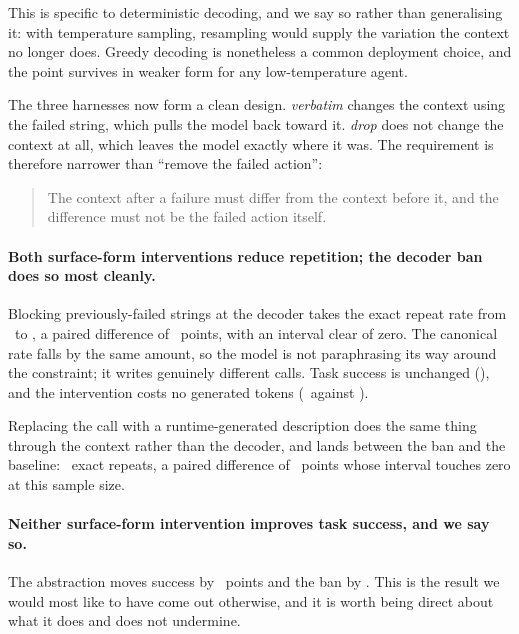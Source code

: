 This is specific to deterministic decoding, and we say so rather than
generalising it: with temperature sampling, resampling would supply the
variation the context no longer does. Greedy decoding is nonetheless a common
deployment choice, and the point survives in weaker form for any low-temperature
agent.

The three harnesses now form a clean design. \emph{verbatim} changes the context
using the failed string, which pulls the model back toward it. \emph{drop} does
not change the context at all, which leaves the model exactly where it was.
The requirement is therefore narrower than ``remove the failed action'':

\begin{quote}
The context after a failure must differ from the context before it, and the
difference must not be the failed action itself.
\end{quote}

\paragraph{Both surface-form interventions reduce repetition; the decoder ban
does so most cleanly.}
Blocking previously-failed strings at the decoder takes the exact repeat rate
from \AgentVerbatimRepeat\ to \AgentVerbBanRepeat, a paired difference of
\DeltaVerbBanRepeat\ points, with an interval clear of zero. The canonical rate
falls by the same amount, so the model is not paraphrasing its way around the constraint; it writes
genuinely different calls. Task success is
unchanged (\DeltaVerbBanSuccess), and the intervention costs no generated tokens
(\AgentVerbBanTokens\ against \AgentVerbatimTokens).

Replacing the call with a runtime-generated description does the same thing
through the context rather than the decoder, and lands between the ban and the
baseline: \AgentAbstractRepeat\ exact repeats, a paired difference of
\DeltaAbstractRepeat\ points whose interval touches zero at this sample size.

\paragraph{Neither surface-form intervention improves task success, and we say
so.}
The abstraction moves success by \DeltaAbstractSuccess\ points and the ban by
\DeltaVerbBanSuccess. This is the result we would most like to have come out
otherwise, and it is worth being direct about what it does and does not
undermine.


